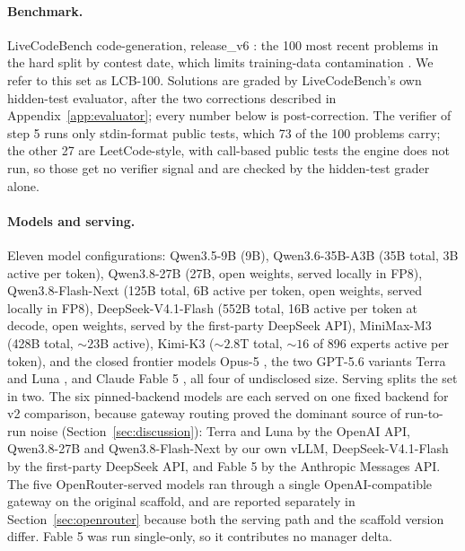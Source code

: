 \documentclass{article}
\begin{document}
\paragraph{Benchmark.} LiveCodeBench code-generation, release\_v6 \citep{jain2024}: the 100
most recent problems in the hard split by contest date, which limits training-data
contamination \citep{jain2024}. We refer to this set as LCB-100. Solutions are graded by
LiveCodeBench's own hidden-test evaluator, after the two corrections described in
Appendix~\ref{app:evaluator}; every number below is post-correction. The verifier of step 5
runs only stdin-format public tests, which 73 of the 100 problems carry; the other 27 are
LeetCode-style, with call-based public tests the engine does not run, so those get no verifier
signal and are checked by the hidden-test grader alone.

\paragraph{Models and serving.} Eleven model configurations: Qwen3.5-9B \citep{qwen2026a} (9B),
Qwen3.6-35B-A3B \citep{qwen2026b} (35B total, 3B active per token), Qwen3.8-27B
\citep{qwen2026c} (27B, open weights, served locally in FP8), Qwen3.8-Flash-Next
\citep{qwen2026d} (125B total, 6B active per token, open weights, served locally in FP8),
DeepSeek-V4.1-Flash \citep{deepseek2026} (552B total, 16B active per token at decode, open
weights, served by the first-party DeepSeek API), MiniMax-M3 \citep{minimax2026}
(428B total, ${\sim}23$B active), Kimi-K3 \citep{moonshot2026} (${\sim}2.8$T total,
${\sim}16$ of 896 experts active per token), and the closed frontier models Opus-5
\citep{anthropic2026}, the two GPT-5.6 variants Terra and Luna \citep{openai2026}, and Claude
Fable 5 \citep{anthropic2026}, all four of undisclosed size. Serving splits the set in two.
The six pinned-backend models are each served on one fixed backend for v2 comparison, because
gateway routing proved the dominant source of run-to-run noise (Section~\ref{sec:discussion}):
Terra and Luna by the OpenAI API, Qwen3.8-27B and Qwen3.8-Flash-Next by our own vLLM,
DeepSeek-V4.1-Flash by the first-party DeepSeek API, and Fable 5 by the
Anthropic Messages API. The five OpenRouter-served models ran through a
single OpenAI-compatible gateway on the original scaffold, and are reported separately in
Section~\ref{sec:openrouter} because both the serving path and the scaffold version differ.
Fable 5 was run single-only, so it contributes no manager delta.
\end{document}
